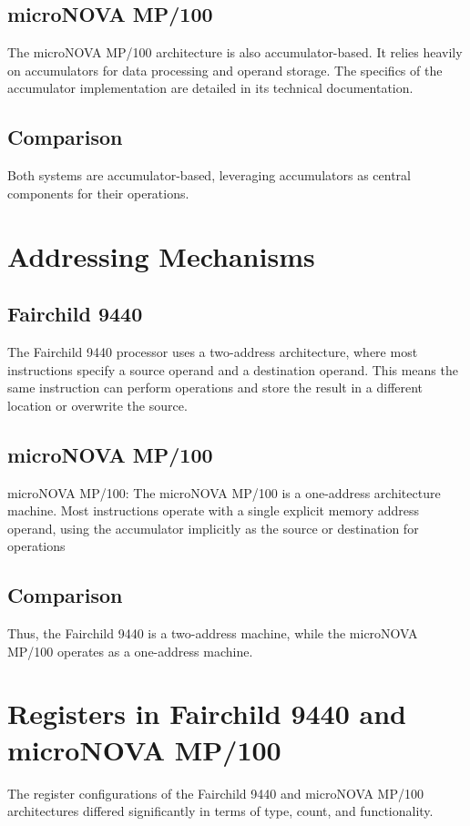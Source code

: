 \documentclass[a4paper,12pt]{article}
\begin{document}
\subsection{microNOVA MP/100}
The microNOVA MP/100 architecture is also accumulator-based. It relies heavily on accumulators for data processing and operand storage. The specifics of the accumulator implementation are detailed in its technical documentation.

\subsection{Comparison}
Both systems are accumulator-based, leveraging accumulators as central components for their operations.

\section{Addressing Mechanisms}


\subsection{Fairchild 9440}
The Fairchild 9440 processor uses a two-address architecture, where most instructions specify a source operand and a destination operand. This means the same instruction can perform operations and store the result in a different location or overwrite the source.
\subsection{microNOVA MP/100}
microNOVA MP/100: The microNOVA MP/100 is a one-address architecture machine. Most instructions operate with a single explicit memory address operand, using the accumulator implicitly as the source or destination for operations

\subsection{Comparison}
Thus, the Fairchild 9440 is a two-address machine, while the microNOVA MP/100 operates as a one-address machine.

\section{Registers in Fairchild 9440 and microNOVA MP/100}

The register configurations of the Fairchild 9440 and microNOVA MP/100 architectures differed significantly in terms of type, count, and functionality.
\end{document}
